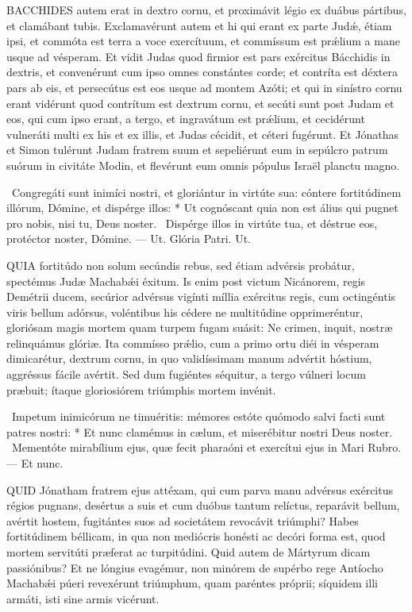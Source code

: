 \lettrine[lines=2]{B}{ACCHIDES} autem erat in dextro cornu, et proximávit légio ex duábus pártibus, et clamábant tubis. Exclamavérunt autem et hi qui erant ex parte Judǽ, étiam ipsi, et commóta est terra a voce exercítuum, et commíssum est prǽlium a mane usque ad vésperam. Et vidit Judas quod firmior est pars exércitus Bácchidis in dextris, et convenérunt cum ipso omnes constántes corde; et contríta est déxtera pars ab eis, et persecútus est eos usque ad montem Azóti; et qui in sinístro cornu erant vidérunt quod contrítum est dextrum cornu, et secúti sunt post Judam et eos, qui cum ipso erant, a tergo, et ingravátum est prǽlium, et cecidérunt vulneráti multi ex his et ex illis, et Judas cécidit, et céteri fugérunt. Et Jónathas et Simon tulérunt Judam fratrem suum et sepeliérunt eum in sepúlcro patrum suórum in civitáte Modin, et flevérunt eum omnis pópulus Israël planctu magno.

\R\ Congregáti sunt inimíci nostri, et gloriántur in virtúte sua: cóntere fortitúdinem illórum, Dómine, et dispérge illos: * Ut cognóscant quia non est álius qui pugnet pro nobis, nisi tu, Deus noster. \V\ Dispérge illos in virtúte tua, et déstrue eos, protéctor noster, Dómine. — Ut. Glória Patri. Ut.




\lettrine[lines=2]{Q}{UIA} fortitúdo non solum secúndis rebus, sed étiam advérsis probátur, spectémus Judæ Machabǽi éxitum. Is enim post victum Nicánorem, regis Demétrii ducem, secúrior advérsus vigínti míllia exércitus regis, cum octingéntis viris bellum adórsus, voléntibus his cédere ne multitúdine opprimeréntur, gloriósam magis mortem quam turpem fugam suásit: Ne crimen, inquit, nostræ relinquámus glóriæ. Ita commísso prǽlio, cum a primo ortu diéi in vésperam dimicarétur, dextrum cornu, in quo validíssimam manum advértit hóstium, aggréssus fácile avértit. Sed dum fugiéntes séquitur, a tergo vúlneri locum præbuit; ítaque gloriosiórem triúmphis mortem invénit.

\R\ Impetum inimicórum ne timuéritis: mémores estóte quómodo salvi facti sunt patres nostri: * Et nunc clamémus in cælum, et miserébitur nostri Deus noster. \V\ Mementóte mirabílium ejus, quæ fecit pharaóni et exercítui ejus in Mari Rubro. — Et nunc.


\lettrine[lines=2]{Q}{UID} Jónatham fratrem ejus attéxam, qui cum parva manu advérsus exércitus régios pugnans, desértus a suis et cum duóbus tantum relíctus, reparávit bellum, avértit hostem, fugitántes suos ad societátem revocávit triúmphi? Habes fortitúdinem béllicam, in qua non mediócris honésti ac decóri forma est, quod mortem servitúti præferat ac turpitúdini. Quid autem de Mártyrum dicam passiónibus? Et ne lóngius evagémur, non minórem de supérbo rege Antíocho Machabǽi púeri revexérunt triúmphum, quam paréntes próprii; síquidem illi armáti, isti sine armis vicérunt.

